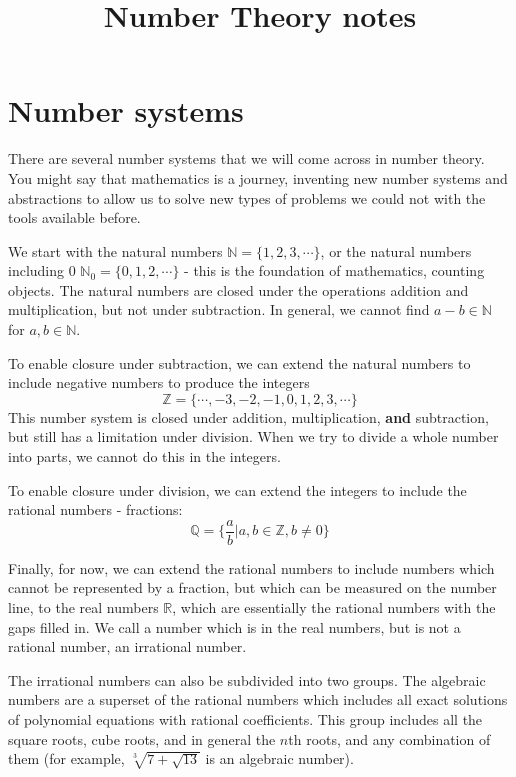 \documentclass{article}
\begin{document}
\title{Number Theory notes}

\maketitle

\section{Number systems}

There are several number systems that we will come across in number theory.
You might say that mathematics is a journey, inventing new number systems
and abstractions to allow us to solve new types of problems we could not
with the tools available before.

We start with the natural numbers $\mathbb{N} = \{1,2,3,\cdots\}$, or the
natural numbers including 0 $\mathbb{N}_0 = \{0,1,2,\cdots\}$ - this
is the foundation of mathematics, counting objects. The natural numbers are
closed under the operations addition and multiplication, but not under
subtraction. In general, we cannot find $a-b \in \mathbb{N}$ for $a,b \in
\mathbb{N}$.

To enable closure under subtraction, we can extend the natural numbers to
include negative numbers to produce the integers
\[\mathbb{Z} = \{\cdots,-3,-2,-1,0,1,2,3,\cdots\}\] This number system is
closed under addition, multiplication, \textbf{and} subtraction, but still
has a limitation under division. When we try to divide a whole number into
parts, we cannot do this in the integers.

To enable closure under division, we can extend the integers to include the
rational numbers - fractions: \[\mathbb{Q} = \{\frac{a}{b} | a,b\in \mathbb{Z},
b \neq 0 \}\]

Finally, for now, we can extend the rational numbers to include numbers which
cannot be represented by a fraction, but which can be measured on the number
line, to the real numbers $\mathbb{R}$, which are essentially the rational
numbers with the gaps filled in. We call a number which is in the real numbers,
but is not a rational number, an irrational number.

The irrational numbers can also be subdivided into two groups. The algebraic
numbers are a superset of the rational numbers which includes all 
exact solutions of polynomial equations with rational coefficients. This group
includes all the square roots, cube roots, and in general the $n$th roots,
and any combination of them (for example, $\sqrt[3]{7+\sqrt{13}}$ is an
algebraic number).
\end{document}
